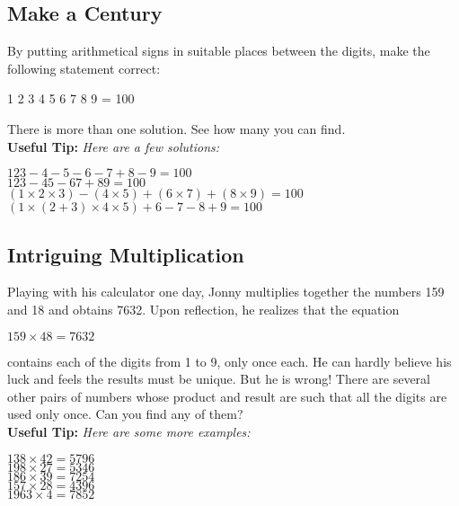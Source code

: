	\subsection{Make a Century}
	By putting arithmetical signs in suitable places between the digits, make the following statement correct:
	\begin{center}
	1 2 3 4 5 6 7 8 9 = 100\\
	\end{center}		
	There is more than one solution. See how many you can find.\\
	\textbf{Useful Tip:} \emph{Here are a few solutions:}
	\begin{center}
	$123 - 4 - 5 - 6 - 7 + 8 - 9 = 100$\\
	$123 - 45 - 67 + 89 = 100$\\
	$(1 \times 2 \times 3) - (4 \times 5) + (6 \times 7) + (8 \times 9) = 100$\\
	$(1 \times (2 + 3) \times 4 \times 5) + 6 - 7 - 8 + 9 = 100$
	\end{center}
	\subsection{Intriguing Multiplication}
	Playing with his calculator one day, Jonny multiplies together the numbers 159 and 18 and obtains 7632. Upon reflection, he realizes that the equation
	\begin{center}
	$159 \times 48 = 7632$\\
	\end{center}
	contains each of the digits from 1 to 9, only once each. He can hardly believe his luck and feels the results must be unique. But he is wrong! There are several other pairs of numbers whose product and result are such that all the digits are used only once. Can you find any of them?\\
	\textbf{Useful Tip:} \emph{Here are some more examples:}
	\begin{center}
	$138 \times 42 = 5796$\\
	$198 \times 27 = 5346$\\
	$186 \times 39 = 7254$\\
	$157 \times 28 = 4396$\\
	$1963 \times 4 = 7852$
	\end{center}
	
